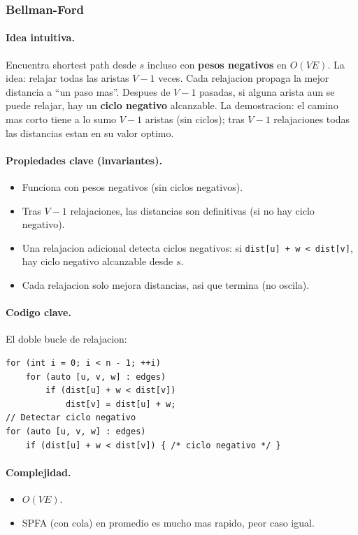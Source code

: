 ﻿\subsubsection{Bellman-Ford}

\paragraph{Idea intuitiva.}
Encuentra shortest path desde $s$ incluso con \textbf{pesos negativos} en $O(VE)$. La idea: relajar todas las aristas $V - 1$ veces. Cada relajacion propaga la mejor distancia a ``un paso mas''. Despues de $V - 1$ pasadas, si alguna arista aun se puede relajar, hay un \textbf{ciclo negativo} alcanzable. La demostracion: el camino mas corto tiene a lo sumo $V - 1$ aristas (sin ciclos); tras $V - 1$ relajaciones todas las distancias estan en su valor optimo.

\paragraph{Propiedades clave (invariantes).}
\begin{itemize}\setlength\itemsep{0pt}
	\item Funciona con pesos negativos (sin ciclos negativos).
	\item Tras $V - 1$ relajaciones, las distancias son definitivas (si no hay ciclo negativo).
	\item Una relajacion adicional detecta ciclos negativos: si \texttt{dist[u] + w < dist[v]}, hay ciclo negativo alcanzable desde $s$.
	\item Cada relajacion solo mejora distancias, asi que termina (no oscila).
\end{itemize}

\paragraph{Codigo clave.}
El doble bucle de relajacion:
\begin{verbatim}
for (int i = 0; i < n - 1; ++i)
    for (auto [u, v, w] : edges)
        if (dist[u] + w < dist[v])
            dist[v] = dist[u] + w;
// Detectar ciclo negativo
for (auto [u, v, w] : edges)
    if (dist[u] + w < dist[v]) { /* ciclo negativo */ }
\end{verbatim}

\paragraph{Complejidad.}
\begin{itemize}\setlength\itemsep{0pt}
	\item $O(VE)$.
	\item SPFA (con cola) en promedio es mucho mas rapido, peor caso igual.
\end{itemize}

